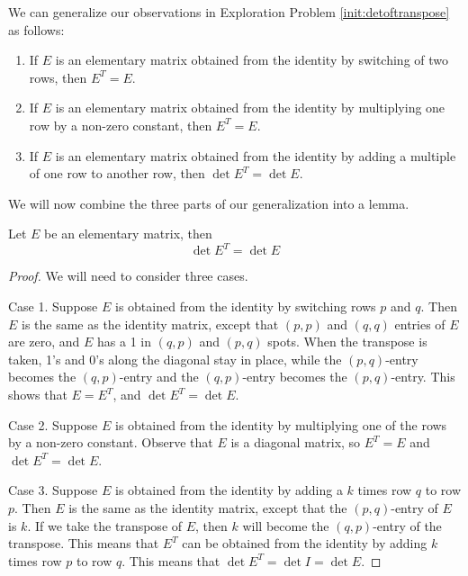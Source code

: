 \documentclass{ximera}
\begin{document}
\begin{general} We can generalize our observations in Exploration Problem \ref{init:detoftranspose} as follows:
\begin{enumerate}
\item If $E$ is an elementary matrix obtained from the identity by switching of two rows, then $E^T=E$.
\item If $E$ is an elementary matrix obtained from the identity by multiplying one row by a non-zero constant, then $E^T=E$.
\item If $E$ is an elementary matrix obtained from the identity by adding a multiple of one row to another row, then $\det{E^T}=\det{E}$.
\end{enumerate}
\end{general}

We will now combine the three parts of our generalization into a lemma.

\begin{lemma}\label{lemma:detofelementarymat}
Let $E$ be an elementary matrix, then
$$\det{E^T}=\det{E}$$
\end{lemma}

\begin{proof}
We will need to consider three cases.

Case 1.  Suppose $E$ is obtained from the identity by switching rows $p$ and $q$.  Then $E$ is the same as the identity matrix, except that $(p,p)$ and $(q, q)$ entries of $E$ are zero, and $E$ has a 1 in $(q, p)$ and $(p, q)$ spots.  When the transpose is taken, 1's and 0's along the diagonal stay in place, while the $(p,q)$-entry becomes the $(q, p)$-entry and the $(q,p)$-entry becomes the $(p,q)$-entry.  This shows that $E=E^T$, and $\det{E^T}=\det{E}$.

Case 2.  Suppose $E$ is obtained from the identity by multiplying one of the rows by a non-zero constant.  Observe that $E$ is a diagonal matrix, so $E^T=E$ and $\det{E^T}=\det{E}$.

Case 3.  Suppose $E$ is obtained from the identity by adding a $k$ times row $q$ to row $p$.  Then $E$ is the same as the identity matrix, except that the $(p,q)$-entry of $E$ is $k$.  If we take the transpose of $E$, then $k$ will become the $(q,p)$-entry of the transpose.  This means that $E^T$ can be obtained from the identity by adding $k$ times row $p$ to row $q$.  This means that $\det{E^T}=\det{I}=\det{E}$.
\end{proof}
\end{document}
